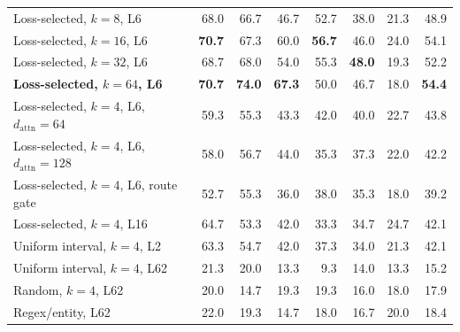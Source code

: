 \begin{table}[t]
\begin{tabular}{lrrrrrrr}
Loss-selected, $k=8$, L6 & 68.0 & 66.7 & 46.7 & 52.7 & 38.0 & 21.3 & 48.9 \\
Loss-selected, $k=16$, L6 & \textbf{70.7} & 67.3 & 60.0 & \textbf{56.7} & 46.0 & 24.0 & 54.1 \\
Loss-selected, $k=32$, L6 & 68.7 & 68.0 & 54.0 & 55.3 & \textbf{48.0} & 19.3 & 52.2 \\
\textbf{Loss-selected, $k=64$, L6} & \textbf{70.7} & \textbf{74.0} & \textbf{67.3} & 50.0 & 46.7 & 18.0 & \textbf{54.4} \\
Loss-selected, $k=4$, L6, $d_{\mathrm{attn}}=64$ & 59.3 & 55.3 & 43.3 & 42.0 & 40.0 & 22.7 & 43.8 \\
Loss-selected, $k=4$, L6, $d_{\mathrm{attn}}=128$ & 58.0 & 56.7 & 44.0 & 35.3 & 37.3 & 22.0 & 42.2 \\
Loss-selected, $k=4$, L6, route gate & 52.7 & 55.3 & 36.0 & 38.0 & 35.3 & 18.0 & 39.2 \\
Loss-selected, $k=4$, L16 & 64.7 & 53.3 & 42.0 & 33.3 & 34.7 & 24.7 & 42.1 \\
Uniform interval, $k=4$, L2 & 63.3 & 54.7 & 42.0 & 37.3 & 34.0 & 21.3 & 42.1 \\
Uniform interval, $k=4$, L62 & 21.3 & 20.0 & 13.3 & 9.3 & 14.0 & 13.3 & 15.2 \\
Random, $k=4$, L62 & 20.0 & 14.7 & 19.3 & 19.3 & 16.0 & 18.0 & 17.9 \\
Regex/entity, L62 & 22.0 & 19.3 & 14.7 & 18.0 & 16.7 & 20.0 & 18.4 \\
\bottomrule
\end{tabular}
\end{table}
